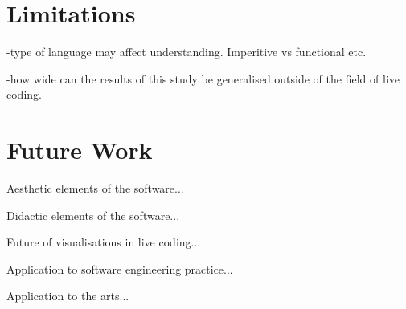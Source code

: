 \section{Limitations}

-type of language may affect understanding. Imperitive vs functional etc.

-how wide can the results of this study be generalised outside of the field of live coding.

\section{Future Work}

Aesthetic elements of the software...

Didactic elements of the software...

Future of visualisations in live coding...

Application to software engineering practice...

Application to the arts...

